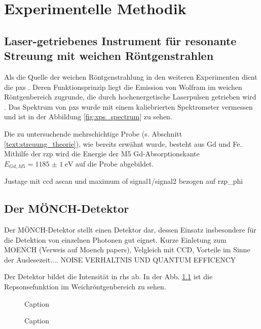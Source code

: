 \chapter{Experimentelle Methodik}

\section{Laser-getriebenes Instrument für resonante Streuung mit weichen Röntgenstrahlen}
Als die Quelle der weichen Röntgenstrahlung in den weiteren Experimenten dient die \gls{pxs} \cite{schick_laser-driven_2021}. Deren Funktionsprinzip liegt die Emission von Wolfram im weichen Röntgenbereich zugrunde, die durch hochenergetische Laserpulsen getrieben wird \cite{mantouvalou_high_2015}. Das Spektrum von \gls{pxs} wurde mit einem kaliebrierten Spektrometer vermessen und ist in der Abbildung \ref{fig:xps_spectrum} zu sehen.

Die zu untersuchende mehrschichtige Probe (s. Abschnitt \ref{text:streuung_theorie}), wie bereits erwähnt wurde, besteht aus Gd und Fe. Mithilfe der \gls{rzp} wird die Energie der M5 Gd-Absorptionskante $E_{Gd, M5} = \SI{1185(1)}{\eV}$ \cite[Abb. 6(a)]{prieto_x-ray_2005} auf die Probe abgebildet.

Justage mit ccd ascan und maximum of signal1/signal2 bezogen auf rzp\_phi 

\section{Der MÖNCH-Detektor}
\label{text:moench_theorie}
Der MÖNCH-Detektor stellt einen Detektor dar, dessen Einsatz insbesondere für die Detektion von einzelnen Photonen gut eignet. \cite{bergamaschi_monch_2018}
Kurze Einletung zum MOENCH (Verweis auf Moench papers), Velgleich mit CCD, Vorteile 
im Sinne der Auslesezeit.... NOISE VERHALTNIS  UND QUANTUM EFFICENCY

Der Detektor bildet die Intensität in \gls{rhs} ab. In der Abb. \ref{fig:response_moench} ist die Repsonsefunktion im Weichröntgenbereich zu sehen. 
\begin{figure}[H]
    \centering
    
    \caption{Caption}
    \label{fig:response_moench}
\end{figure}
\begin{figure}[H]
    \centering
    
    \caption{Caption}
    \label{fig:noise_moench}
\end{figure}
